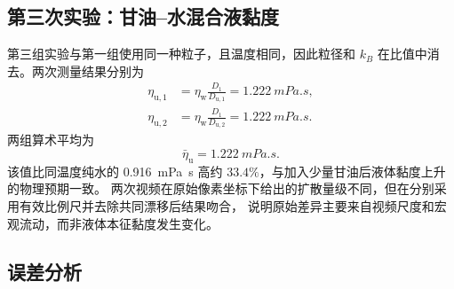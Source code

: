 \documentclass[11pt]{article}
\begin{document}
\subsection{第三次实验：甘油--水混合液黏度}

第三组实验与第一组使用同一种粒子，且温度相同，因此粒径和 $k_B$ 在比值中消去。两次测量结果分别为
\begin{align}
    \eta_{\mathrm{u},1}
    &=\eta_{\mathrm w}\frac{D_1}{D_{\mathrm{u},1}}
      =\SI{1.222}{mPa.s},\\
    \eta_{\mathrm{u},2}
    &=\eta_{\mathrm w}\frac{D_1}{D_{\mathrm{u},2}}
      =\SI{1.222}{mPa.s}.
\end{align}
两组算术平均为
\begin{equation}
    \bar{\eta}_{\mathrm u}=\SI{1.222}{mPa.s}.
\end{equation}
该值比同温度纯水的 \SI{0.916}{mPa.s} 高约 $33.4\%$，与加入少量甘油后液体黏度上升的物理预期一致。
两次视频在原始像素坐标下给出的扩散量级不同，但在分别采用有效比例尺并去除共同漂移后结果吻合，
说明原始差异主要来自视频尺度和宏观流动，而非液体本征黏度发生变化。

\subsection{误差分析}
\end{document}

